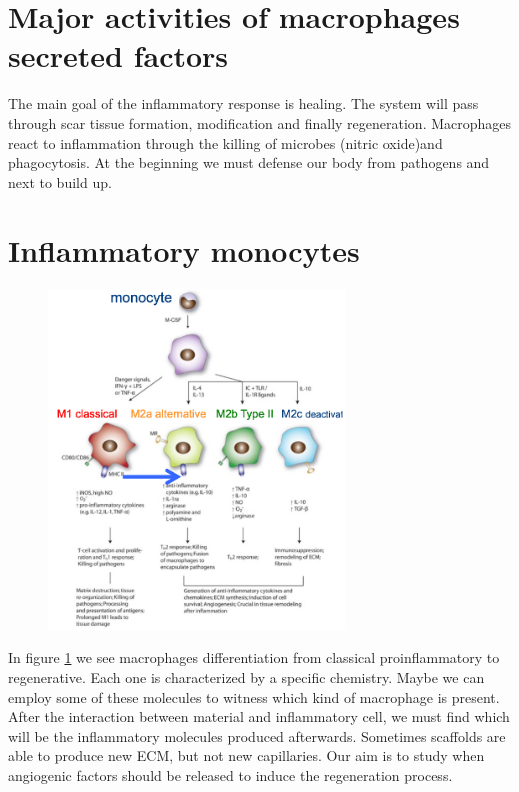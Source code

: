 \section{Major activities of macrophages secreted factors}
The main goal of the inflammatory response is healing. 
The system will pass through scar tissue formation, modification and finally regeneration. Macrophages react to inflammation through the killing of microbes (nitric oxide)and phagocytosis. 
At the beginning we must defense our body from pathogens and next to build up.

\section{Inflammatory monocytes}
\begin{figure}[ht]
\includegraphics[width=0.7\textwidth]{mono_diff}
\caption{\label{fig:mono}}
\end{figure}
In figure \ref{fig:mono} we see macrophages differentiation from classical proinflammatory to regenerative. 
Each one is characterized by a specific chemistry. 
Maybe we can employ some of these molecules to witness which kind of macrophage is present. After the interaction between material and inflammatory cell, we must find which will be the inflammatory molecules produced afterwards. 
Sometimes scaffolds are able to produce new ECM, but not new capillaries. 
Our aim is to study when angiogenic factors should be released to induce the regeneration process. 
 
